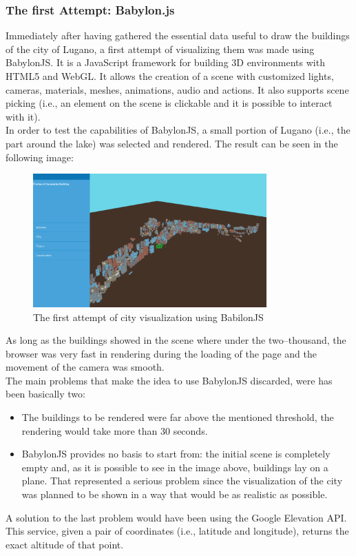 \subsubsection{The first Attempt: Babylon.js}
Immediately after having gathered the essential data useful to draw the buildings of the city of Lugano, a first attempt of visualizing them was made using BabylonJS. It is a JavaScript framework for building 3D environments with HTML5 and WebGL. It allows the creation of a scene with customized lights, cameras, materials, meshes, animations, audio and actions. It also supports scene picking (i.e., an element on the scene is clickable and it is possible to interact with it).\\

In order to test the capabilities of BabylonJS, a small portion of Lugano (i.e., the part around the lake) was selected and rendered. The result can be seen in the following image:
\begin{figure}[H]
\centering
\includegraphics[width=0.8\textwidth]{chapter3/images/babylonJS}
\caption{The first attempt of city visualization using BabilonJS}
\label{fig:babilonJS}
\end{figure}
As long as the buildings showed in the scene where under the two--thousand, the browser was very fast in rendering during the loading of the page and the movement of the camera was smooth.\\
The main problems that make the idea to use BabylonJS discarded, were has been basically two:
\begin{itemize}
	\item The buildings to be rendered were far above the mentioned threshold, the rendering would take more than 30 seconds.
	\item BabylonJS provides no basis to start from: the initial scene is completely empty and, as it is possible to see in the image above, buildings lay on a plane. That represented a serious problem since the visualization of the city was planned to be shown in a way that would be as realistic as possible.
\end{itemize}
A solution to the last problem would have been using the Google Elevation API. This service, given a pair of coordinates (i.e., latitude and longitude), returns the exact altitude of that point.\\

